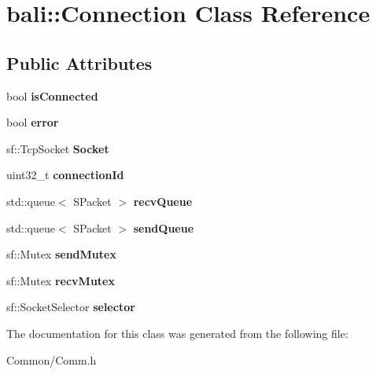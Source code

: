 \hypertarget{classbali_1_1_connection}{\section{bali\-:\-:Connection Class Reference}
\label{classbali_1_1_connection}
}
\subsection*{Public Attributes}
\begin{DoxyCompactItemize}
\item 
\hypertarget{classbali_1_1_connection_a9b78e778a4ffff7130a42a0eff675aed}{bool {\bfseries is\-Connected}}\label{classbali_1_1_connection_a9b78e778a4ffff7130a42a0eff675aed}

\item 
\hypertarget{classbali_1_1_connection_a82a3883779d88f4a7b47273685474415}{bool {\bfseries error}}\label{classbali_1_1_connection_a82a3883779d88f4a7b47273685474415}

\item 
\hypertarget{classbali_1_1_connection_a4932617f02fc0172a8a58ecfbf73012a}{sf\-::\-Tcp\-Socket {\bfseries Socket}}\label{classbali_1_1_connection_a4932617f02fc0172a8a58ecfbf73012a}

\item 
\hypertarget{classbali_1_1_connection_a5b743d1735d950b73996e2b873d7e134}{uint32\-\_\-t {\bfseries connection\-Id}}\label{classbali_1_1_connection_a5b743d1735d950b73996e2b873d7e134}

\item 
\hypertarget{classbali_1_1_connection_a6a6f0fbb07401ab4320904410ae7a3b7}{std\-::queue$<$ S\-Packet $>$ {\bfseries recv\-Queue}}\label{classbali_1_1_connection_a6a6f0fbb07401ab4320904410ae7a3b7}

\item 
\hypertarget{classbali_1_1_connection_a230fb7e6c5450c5e5831744cb6eb30cd}{std\-::queue$<$ S\-Packet $>$ {\bfseries send\-Queue}}\label{classbali_1_1_connection_a230fb7e6c5450c5e5831744cb6eb30cd}

\item 
\hypertarget{classbali_1_1_connection_a5678dcf1a4e900bec9e822735036a193}{sf\-::\-Mutex {\bfseries send\-Mutex}}\label{classbali_1_1_connection_a5678dcf1a4e900bec9e822735036a193}

\item 
\hypertarget{classbali_1_1_connection_abadf894927777980915fac3a31c81ce4}{sf\-::\-Mutex {\bfseries recv\-Mutex}}\label{classbali_1_1_connection_abadf894927777980915fac3a31c81ce4}

\item 
\hypertarget{classbali_1_1_connection_a342fa298923ee7a7d6222d180c59804a}{sf\-::\-Socket\-Selector {\bfseries selector}}\label{classbali_1_1_connection_a342fa298923ee7a7d6222d180c59804a}

\end{DoxyCompactItemize}


The documentation for this class was generated from the following file\-:\begin{DoxyCompactItemize}
\item 
Common/Comm.\-h\end{DoxyCompactItemize}
